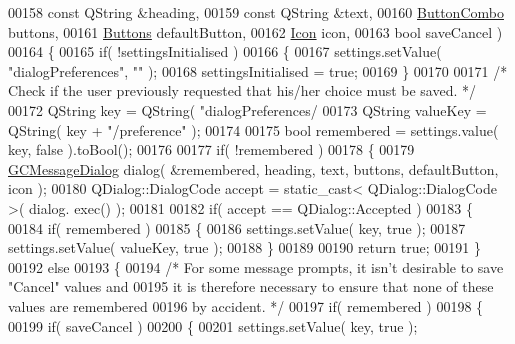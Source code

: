 \begin{DoxyCode}
00158                      \textcolor{keyword}{const} QString &heading,
00159                      \textcolor{keyword}{const} QString &text,
00160                      \hyperlink{namespace_g_c_message_space_ac1db082c29062fe6508ba03bf76bea44}{ButtonCombo} buttons,
00161                      \hyperlink{namespace_g_c_message_space_a631906a7d53f30328cf2249a00078b5b}{Buttons} defaultButton,
00162                      \hyperlink{namespace_g_c_message_space_a67e94586e09cbc305257fbcdd7b686e2}{Icon} icon,
00163                      \textcolor{keywordtype}{bool} saveCancel )
00164   \{
00165     \textcolor{keywordflow}{if}( !settingsInitialised )
00166     \{
00167       settings.setValue( \textcolor{stringliteral}{"dialogPreferences"}, \textcolor{stringliteral}{""} );
00168       settingsInitialised = \textcolor{keyword}{true};
00169     \}
00170 
00171     \textcolor{comment}{/* Check if the user previously requested that his/her choice must be
       saved. */}
00172     QString key = QString( \textcolor{stringliteral}{"dialogPreferences/%
00173     QString valueKey = QString( key + \textcolor{stringliteral}{"/preference"} );
00174 
00175     \textcolor{keywordtype}{bool} remembered = settings.value( key, \textcolor{keyword}{false} ).toBool();
00176 
00177     \textcolor{keywordflow}{if}( !remembered )
00178     \{
00179       \hyperlink{class_g_c_message_dialog}{GCMessageDialog} dialog( &remembered, heading, text, buttons, 
      defaultButton, icon );
00180       QDialog::DialogCode accept = \textcolor{keyword}{static\_cast<} QDialog::DialogCode \textcolor{keyword}{>}( dialog.
      exec() );
00181 
00182       \textcolor{keywordflow}{if}( accept == QDialog::Accepted )
00183       \{
00184         \textcolor{keywordflow}{if}( remembered )
00185         \{
00186           settings.setValue( key, \textcolor{keyword}{true} );
00187           settings.setValue( valueKey, \textcolor{keyword}{true} );
00188         \}
00189 
00190         \textcolor{keywordflow}{return} \textcolor{keyword}{true};
00191       \}
00192       \textcolor{keywordflow}{else}
00193       \{
00194         \textcolor{comment}{/* For some message prompts, it isn't desirable to save "Cancel" values
       and}
00195 \textcolor{comment}{          it is therefore necessary to ensure that none of these values are
       remembered}
00196 \textcolor{comment}{          by accident. */}
00197         \textcolor{keywordflow}{if}( remembered )
00198         \{
00199           \textcolor{keywordflow}{if}( saveCancel )
00200           \{
00201             settings.setValue( key, \textcolor{keyword}{true} );
}
\end{DoxyCode}
